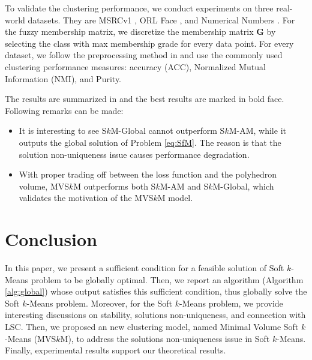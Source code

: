\documentclass[journal]{IEEEtran}
\begin{document}
To validate the clustering performance, we conduct experiments on three real-world datasets. They are MSRCv1 \cite{winn2005locus}, ORL Face \cite{samaria1994parameterisation}, and Numerical Numbers \cite{asuncion2007uci}.
For the fuzzy membership matrix, we discretize the membership matrix $\mathbf{G}$ by selecting the class with max membership grade for every data point.
For every dataset, we follow the preprocessing method in \cite{nie2018multiview} and use the commonly used clustering performance measures:
accuracy (ACC), Normalized Mutual Information (NMI), and Purity.

The results are summarized in  and the best results are marked in bold face. Following remarks can be made:
\begin{itemize}
	\item It is interesting to see S$k$M-Global cannot outperform S$k$M-AM, while it outputs the global solution
	of Problem \eqref{eq:SfM}. The reason is that the solution non-uniqueness issue causes performance degradation.
	\item With proper trading off between the loss function and the polyhedron volume, MVS$k$M outperforms both
	S$k$M-AM and S$k$M-Global, which validates the motivation of the MVS$k$M model.
\end{itemize}
\section{Conclusion}\label{sec:conclusion}

In this paper, we present a sufficient condition for a feasible solution of Soft $k$-Means problem to be globally optimal.
Then, we report an algorithm (Algorithm \ref{alg:global}) whose output satisfies this sufficient condition, thus globally solve the Soft $k$-Means problem.
Moreover, for the Soft $k$-Means problem, we provide interesting discussions on 
stability, solutions non-uniqueness, and connection with LSC.
Then, we proposed an new clustering model, named Minimal Volume Soft $k$-Means (MVS$k$M), to address the solutions non-uniqueness issue in Soft $k$-Means.
Finally, experimental results support our theoretical results.


\end{document}
